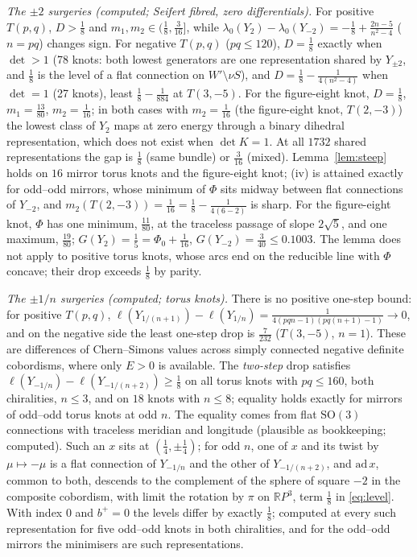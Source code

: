 \documentclass[10pt]{amsart}
\numberwithin{equation}{section}
\theoremstyle{compact}
\theoremstyle{definition}
\newcommand{\R}{\mathbb R}
\newcommand{\SO}{\mathrm{SO}}
\newcommand{\st}[1]{\par\noindent\textit{#1}\enspace}
\begin{document}
\st{The $\pm2$ surgeries (computed; Seifert fibred, zero differentials).}
For positive $T(p,q)$, $D>\frac18$ and $m_1,m_2\in(\frac18,\frac3{16}]$, while
$\lambda_0(Y_2)-\lambda_0(Y_{-2})=-\frac18+\frac{2n-5}{n^2-4}$ ($n=pq$) changes
sign. For negative $T(p,q)$ ($pq\le120$), $D=\frac18$ exactly when $\det>1$ (78 knots:
both lowest generators are one representation shared by $Y_{\pm2}$, and
$\frac18$ is the level of a flat connection on $W'\setminus\nu S$), and
$D=\frac18-\frac1{4(n^2-4)}$ when $\det=1$ (27 knots), least $\frac18-\frac1{884}$
at $T(3,-5)$. For the figure-eight knot, $D=\frac18$, $m_1=\frac{13}{80}$,
$m_2=\frac1{16}$; in both cases with $m_2=\frac1{16}$ (the figure-eight knot,
$T(2,-3)$) the lowest class of $Y_2$ maps at zero energy through a binary
dihedral representation, which does not exist when $\det K=1$. At all
$1732$ shared representations the gap is
$\frac18$ (same bundle) or $\frac3{16}$ (mixed). Lemma~\ref{lem:steep} holds
on $16$ mirror torus knots and the figure-eight knot; (iv) is attained
exactly for odd--odd mirrors, whose minimum of $\Phi$ sits midway between
flat connections of $Y_{-2}$, and $m_2(T(2,-3))=\frac1{16}=\frac18-\frac1{4(6-2)}$
is sharp. For the figure-eight knot, $\Phi$ has one minimum, $\frac{11}{80}$, at
the traceless passage of slope $2\sqrt5$, and one maximum, $\frac{19}{80}$;
$G(Y_2)=\frac15=\Phi_0+\frac1{16}$, $G(Y_{-2})=\frac3{40}\le0.1003$. The lemma
does not apply to positive torus knots, whose arcs end on the reducible
line with $\Phi$ concave; their drop exceeds $\frac18$ by parity.

\st{The $\pm1/n$ surgeries (computed; torus knots).} There is no positive
one-step bound: for positive $T(p,q)$,
$\ell(Y_{1/(n+1)})-\ell(Y_{1/n})=\frac1{4(pqn-1)(pq(n+1)-1)}\to0$, and on the
negative side the least one-step drop is $\frac7{232}$ ($T(3,-5)$, $n=1$).
These are differences of Chern--Simons values across simply connected
negative definite cobordisms, where only $E>0$ is available. The
\emph{two-step} drop satisfies $\ell(Y_{-1/n})-\ell(Y_{-1/(n+2)})\ge\frac18$
on all torus knots with $pq\le160$, both chiralities, $n\le3$, and on $18$
knots with $n\le8$; equality holds exactly for mirrors of odd--odd torus
knots at odd $n$. The equality comes from flat $\SO(3)$ connections with
traceless meridian and longitude (plausible as bookkeeping; computed). Such
an $x$ sits at $(\frac14,\pm\frac14)$; for odd $n$, one of $x$ and its twist
by $\mu\mapsto-\mu$ is a flat connection of $Y_{-1/n}$ and the other of
$Y_{-1/(n+2)}$, and $\mathrm{ad}\,x$, common to both, descends to the
complement of the sphere of square $-2$ in the composite cobordism, with
limit the rotation by $\pi$ on $\R P^3$, term $\frac18$ in \eqref{eq:level}.
With index $0$ and $b^+=0$ the levels differ by exactly $\frac18$; computed at
every such representation for five odd--odd knots in both chiralities, and
for the odd--odd mirrors the minimisers are such representations.
\end{document}
